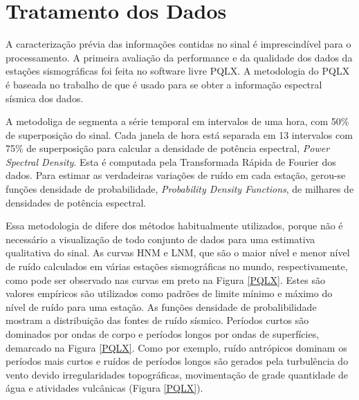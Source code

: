 \section{Tratamento dos Dados}

A caracterização prévia das informações contidas no sinal é imprescindível para o processamento. A primeira avaliação da performance e da qualidade dos dados da estações sismográficas foi feita no software livre PQLX.  A metodologia do PQLX é baseada no trabalho de \cite{McNamara_Buland_2004} que é usado para se obter a informação espectral sísmica dos dados.

A metodoliga de \cite{McNamara_Buland_2004} segmenta a série temporal em intervalos de uma hora, com 50\% de superposição do sinal. Cada janela de hora está separada em 13 intervalos com 75\% de superposição para calcular a densidade de potência espectral, \textit{Power Spectral Density}. Esta é computada pela Transformada Rápida de Fourier dos dados. Para estimar as verdadeiras variações de ruído em cada estação, gerou-se  funções densidade de probabilidade, \textit{Probability Density Functions}, de milhares de densidades de potência espectral.

Essa metodologia de \cite{McNamara_Buland_2004} difere dos métodos habitualmente utilizados, porque não é necessário a visualização de todo conjunto de dados para uma estimativa qualitativa do sinal.  As curvas HNM e LNM, que são o maior nível e menor nível de ruído calculados em várias estações sismográficas no mundo, respectivamente, como pode ser observado nas curvas em preto na Figura \ref{PQLX}. Estes são valores empíricos são utilizados como padrões de limite mínimo e máximo do nível de ruído para uma estação. As funções densidade de probalibilidade mostram a distribuição das fontes de ruído sísmico. Períodos curtos são dominados por ondas de corpo e períodos longos por ondas de superfícies, demarcado na Figura \ref{PQLX}. Como por exemplo, ruído antrópicos dominam os períodos mais curtos e ruídos de períodos longos são gerados pela turbulência do vento devido irregularidades topográficas, movimentação de grade quantidade de água e atividades vulcânicas (Figura \ref{PQLX}).


